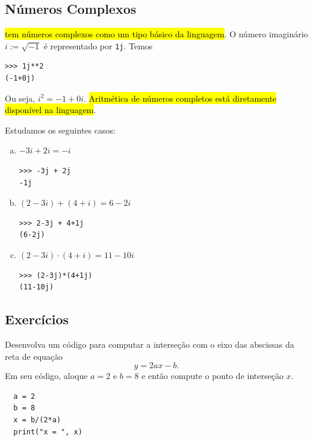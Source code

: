 \subsection{Números Complexos}

\hl{{\python} tem números complexos como um tipo básico da linguagem}. O número imaginário $i := \sqrt{-1}$ é representado por \lstinline+1j+. Temos
\begin{lstlisting}
>>> 1j**2
(-1+0j)
\end{lstlisting}
Ou seja, $i^2 = -1 + 0i$. \hl{Aritmética de números completos está diretamente disponível na linguagem}.

\begin{ex}
  Estudamos os seguintes casos:
  \begin{enumerate}[a)]
  \item $-3i + 2i = -i$
\begin{lstlisting}
>>> -3j + 2j
-1j
\end{lstlisting}

  \item $(2 - 3i) + (4 + i) = 6 -2i$
\begin{lstlisting}
>>> 2-3j + 4+1j
(6-2j)
\end{lstlisting}

  \item $(2 - 3i)\cdot (4 + i) = 11 - 10i$
\begin{lstlisting}
>>> (2-3j)*(4+1j)
(11-10j)
\end{lstlisting}
  \end{enumerate}
\end{ex}

\subsection{Exercícios}

\begin{exer}
  Desenvolva um código {\python} para computar a interseção com o eixo das abscissas da reta de equação
  \begin{equation}
    y =  2ax - b.
  \end{equation}
  Em seu código, aloque $a=2$ e $b=8$ e então compute o ponto de interseção $x$.
\end{exer}
\begin{resp}
\begin{lstlisting}
  a = 2
  b = 8
  x = b/(2*a)
  print("x = ", x)
\end{lstlisting}
\end{resp}


